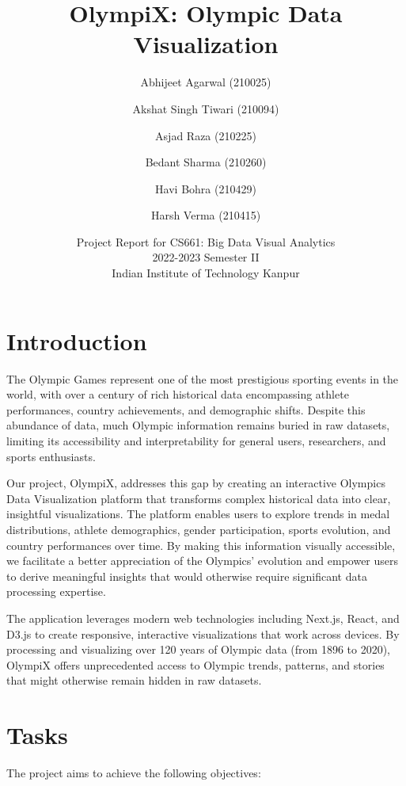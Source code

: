 \documentclass[a4paper, 12pt]{article}
\title{OlympiX: Olympic Data Visualization}
\author{
    Abhijeet Agarwal (210025) \and 
    Akshat Singh Tiwari (210094) \and 
    Asjad Raza (210225) \and 
    Bedant Sharma (210260) \and 
    Havi Bohra (210429) \and 
    Harsh Verma (210415)
}
\date{
    Project Report for CS661: Big Data Visual Analytics \\
    2022-2023 Semester II \\
    Indian Institute of Technology Kanpur
}
\begin{document}
\maketitle

\section{Introduction}
The Olympic Games represent one of the most prestigious sporting events in the world, with over a century of rich historical data encompassing athlete performances, country achievements, and demographic shifts. Despite this abundance of data, much Olympic information remains buried in raw datasets, limiting its accessibility and interpretability for general users, researchers, and sports enthusiasts.

Our project, OlympiX, addresses this gap by creating an interactive Olympics Data Visualization platform that transforms complex historical data into clear, insightful visualizations. The platform enables users to explore trends in medal distributions, athlete demographics, gender participation, sports evolution, and country performances over time. By making this information visually accessible, we facilitate a better appreciation of the Olympics' evolution and empower users to derive meaningful insights that would otherwise require significant data processing expertise.

The application leverages modern web technologies including Next.js, React, and D3.js to create responsive, interactive visualizations that work across devices. By processing and visualizing over 120 years of Olympic data (from 1896 to 2020), OlympiX offers unprecedented access to Olympic trends, patterns, and stories that might otherwise remain hidden in raw datasets.

\section{Tasks}
The project aims to achieve the following objectives:
\end{document}
